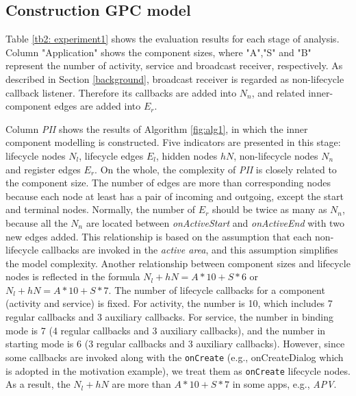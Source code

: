 \subsection{Construction GPC model}
Table \ref{tb2: experiment1} shows the evaluation results for each stage of analysis. Column "Application" shows the component sizes, where "A","S" and "B" represent the number of activity, service and broadcast receiver, respectively. As described in Section \ref{background}, broadcast receiver is regarded as non-lifecycle callback listener. Therefore its callbacks are added into $N_{n}$, and related inner-component edges are added into $E_{r}$.

Column \textit{PII} shows the results of Algorithm \ref{fig:alg1}, in which the inner component modelling is constructed. Five indicators are presented in this stage: lifecycle nodes $N_{l}$, lifecycle edges $E_{l}$, hidden nodes $hN$, non-lifecycle nodes $N_{n}$ and register edges $E_{r}$. On the whole, the complexity of \textit{PII} is closely related to the component size. The number of edges are more than corresponding nodes because each node at least has a pair of incoming and outgoing, except the start and terminal nodes. Normally, the number of $E_{r}$ should be twice as many as $N_{n}$, because all the $N_{n}$ are located between \textit{onActiveStart} and \textit{onActiveEnd} with two new edges added. This relationship is based on the assumption that each non-lifecycle callbacks are invoked in the \textit{active area}, and this assumption simplifies the model complexity. Another relationship between component sizes and lifecycle nodes is reflected in the formula $N_{l} + hN = A*10 + S*6 $ or $ N_{l} + hN = A*10 + S*7$. The number of lifecycle callbacks for a component (activity and service) is fixed. For activity, the number is 10, which includes 7 regular callbacks and 3 auxiliary callbacks. For service, the number in binding mode is 7 (4 regular callbacks and 3 auxiliary callbacks), and the number in starting mode is 6 (3 regular callbacks and 3 auxiliary callbacks). However, since some callbacks are invoked along with the \texttt{onCreate} (e.g., onCreateDialog which is adopted in the motivation example), we treat them as \texttt{onCreate} lifecycle nodes. As a result, the $N_{l} + hN$ are more than $A*10 + S*7$ in some apps, e.g., \textit{APV}.

